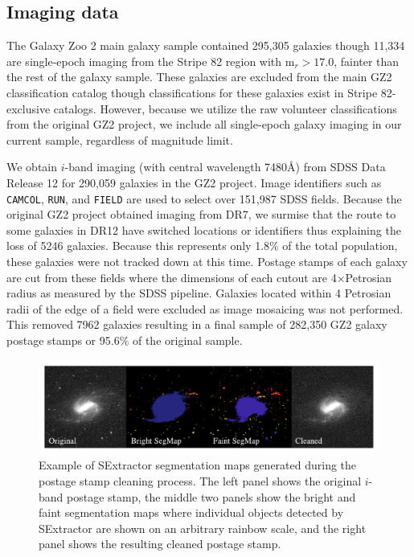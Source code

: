 \subsection{Imaging data}
The Galaxy Zoo 2 main galaxy sample contained 295,305 galaxies though 11,334 are single-epoch imaging from the Stripe 82 region with m$_r > 17.0$, fainter than the rest of the galaxy sample. These galaxies are excluded from the main GZ2 classification catalog though classifications for these galaxies exist in Stripe 82-exclusive catalogs. However, because we utilize the raw volunteer classifications from the original GZ2 project, we include all single-epoch galaxy imaging in our current sample, regardless of magnitude limit.  

We obtain $i$-band imaging (with central wavelength 7480\AA) from SDSS Data Release 12 for 290,059 galaxies in the GZ2 project. Image identifiers such as \texttt{CAMCOL}, \texttt{RUN}, and \texttt{FIELD} are used to select over 151,987 SDSS fields. Because the original GZ2 project obtained imaging from DR7, we surmise that the route to some galaxies in DR12 have switched locations or identifiers thus explaining the loss of 5246 galaxies. Because this represents only 1.8\% of the total population, these galaxies were not tracked down at this time. Postage stamps of each galaxy are cut from these fields where the dimensions of each cutout are 4$\times$Petrosian radius as measured by the SDSS pipeline. Galaxies located within 4 Petrosian radii of the edge of a field were excluded as image mosaicing was not performed. This removed 7962 galaxies resulting in a final sample of 282,350 GZ2 galaxy postage stamps or 95.6\% of the original sample.

\begin{figure}
\includegraphics[width=\textwidth]{Figures/sextractor_example.pdf}
\caption[Example of Source Extractor segmentation maps.]{Example of SExtractor segmentation maps generated during the postage stamp cleaning process. The left panel shows the original $i$-band postage stamp, the middle two panels show the bright and faint segmentation maps where individual objects detected by SExtractor are shown on an arbitrary rainbow scale, and the right panel shows the resulting cleaned postage stamp.}
\label{fig: segmaps}
\end{figure}


